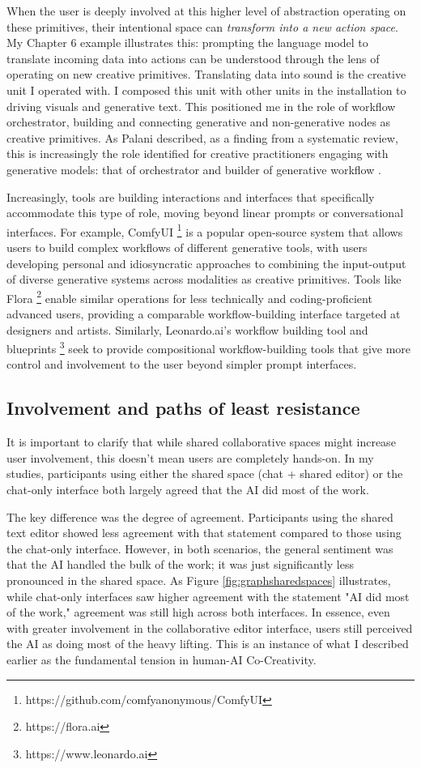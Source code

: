 When the user is deeply involved at this higher level of abstraction operating on these primitives, their intentional space can \textit{transform into a new action space}. My Chapter 6 example illustrates this: prompting the language model to translate incoming data into actions can be understood through the lens of operating on new creative primitives. Translating data into sound is the creative unit I operated with. I composed this unit with other units in the installation to driving visuals and generative text. This positioned me in the role of workflow orchestrator, building and connecting generative and non-generative nodes as creative primitives. As Palani described, as a finding from a systematic review, this is increasingly the role identified for creative practitioners engaging with generative models: that of orchestrator and builder of generative workflow \cite{Palani2024-on}. 

Increasingly, tools are building interactions and interfaces that specifically accommodate this type of role, moving beyond linear prompts or conversational interfaces. For example, ComfyUI \footnote{https://github.com/comfyanonymous/ComfyUI} is a popular open-source system that allows users to build complex workflows of different generative tools, with users developing personal and idiosyncratic approaches to combining the input-output of diverse generative systems across modalities as creative primitives. Tools like Flora \footnote{https://flora.ai} enable similar operations for less technically and coding-proficient advanced users, providing a comparable workflow-building interface targeted at designers and artists. Similarly, Leonardo.ai's workflow building tool and blueprints \footnote{https://www.leonardo.ai} seek to provide compositional workflow-building tools that give more control and involvement to the user beyond simpler prompt interfaces.

\subsection{Involvement and paths of least resistance}

It is important to clarify that while shared collaborative spaces might increase user involvement, this doesn't mean users are completely hands-on. In my studies, participants using either the shared space (chat + shared editor) or the chat-only interface both largely agreed that the AI did most of the work.

The key difference was the degree of agreement. Participants using the shared text editor showed less agreement with that statement compared to those using the chat-only interface. However, in both scenarios, the general sentiment was that the AI handled the bulk of the work; it was just significantly less pronounced in the shared space. As Figure \ref{fig:graphsharedspaces} illustrates, while chat-only interfaces saw higher agreement with the statement "AI did most of the work," agreement was still high across both interfaces. In essence, even with greater involvement in the collaborative editor interface, users still perceived the AI as doing most of the heavy lifting. This is an instance of what I described earlier as the fundamental tension in human-AI Co-Creativity.

